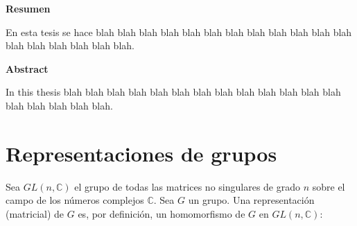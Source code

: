 \documentclass[12pt]{book}
\theoremstyle{definition}
\newcounter{in}
\newcounter{ini}
\begin{document}
\thispagestyle{empty}
\begin{flushleft}
  {\bfseries\Large Resumen}
\end{flushleft}

En esta tesis se hace blah blah blah blah blah blah blah blah blah
blah blah blah blah blah blah blah blah blah.

\vspace{2cm}

\begin{flushleft}
  {\bfseries\Large Abstract}
\end{flushleft}

In this thesis blah blah blah blah blah blah blah blah blah
blah blah blah blah blah blah blah blah blah.



 \newpage \thispagestyle{empty}

\chapter{Representaciones de grupos}
\label{cha:Representaciones de grupos}

Sea $GL\left(n,\mathbb{C}\right)$ el grupo de todas las matrices no
singulares de grado $n$ sobre el campo de los números complejos
$\mathbb{C}$. Sea $G$ un grupo. Una representación (matricial) de $G$
es, por definición, un homomorfismo de $G$ en
$GL\left(n,\mathbb{C}\right)$:
\end{document}
